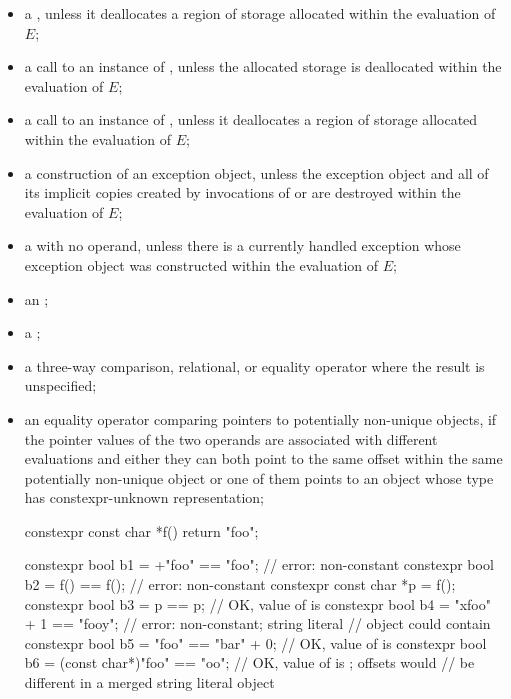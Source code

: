 \begin{itemize}
\item
a ,
unless it deallocates a region of storage
allocated within the evaluation of $E$;

\item
a call to an instance of
,
unless the allocated storage is deallocated within the evaluation of $E$;

\item
a call to an instance of
,
unless it deallocates a region of storage
allocated within the evaluation of $E$;

\item
a construction of an exception object,
unless the exception object and
all of its implicit copies created by invocations of
 or 
are destroyed within the evaluation of $E$;

\item
a  with no operand,
unless there is a currently handled exception
whose exception object was constructed within the evaluation of $E$;

\item
an ;

\item
a ;

\item
a three-way comparison,
relational, or equality
operator where the result is unspecified;

\item
an equality operator comparing pointers to potentially non-unique objects,
if the pointer values of the two operands
are associated with different evaluations and either
they can both point to the same offset within
the same potentially non-unique object or
one of them points to an object whose
type has constexpr-unknown representation;
\begin{example}
\begin{codeblock}
constexpr const char *f() { return "foo"; }

constexpr bool b1 = +"foo" == "foo";        // error: non-constant
constexpr bool b2 = f() == f();             // error: non-constant
constexpr const char *p = f();
constexpr bool b3 = p == p;                 // OK, value of  is 
constexpr bool b4 = "xfoo" + 1 == "foo\0y"; // error: non-constant; string literal
                                            // object could contain 
constexpr bool b5 = "foo" == "bar" + 0;         // OK, value of  is 
constexpr bool b6 = (const char*)"foo" == "oo"; // OK, value of  is ; offsets would
                                                // be different in a merged string literal object


\end{codeblock}
\end{example}
\end{itemize}
